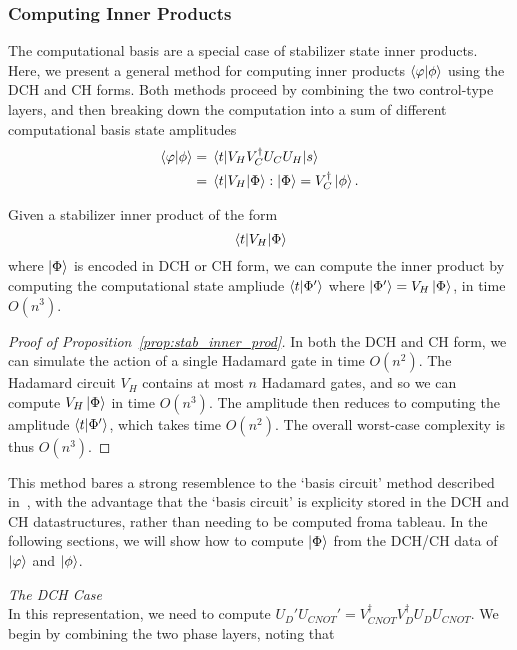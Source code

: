 \subsubsection*{Computing Inner Products}
The computational basis are a special case of stabilizer state inner products. Here, we present a general method for computing inner products $\braket{\varphi}{\phi}$ using the DCH and CH forms. Both methods proceed by combining the two control-type layers, and then breaking down the computation into a sum of different computational basis state amplitudes
\begin{align*}
\braket{\varphi}{\phi} &= \matrixel{t}{V_{H}V_{C}^{\dagger}U_{C}U_{H}}{s} \\
&= \matrixel{t}{V_{H}}{\Phi} : \ket{\Phi} = V_{C}^{\dagger} \ket{\phi}.
\end{align*}
\begin{prop}
Given a stabilizer inner product of the form
\[\matrixel{t}{V_{H}}{\Phi}\]
where $\ket{\Phi}$ is encoded in DCH or CH form, we can compute the inner product by computing the computational state ampliude $\braket{t}{\Phi'}$ where $\ket{\Phi'}=V_{H}\ket{\Phi}$, in time $O(n^{3})$.\label{prop:stab_inner_prod}
\end{prop}
\begin{proof}[Proof of Proposition~\ref{prop:stab_inner_prod}]
In both the DCH and CH form, we can simulate the action of a single Hadamard gate in time $O(n^{2})$. The Hadamard circuit $V_{H}$ contains at most $n$ Hadamard gates, and so we can compute $V_{H}\ket{\Phi}$ in time $O(n^{3})$. The amplitude then reduces to computing the amplitude $\braket{t}{\Phi'}$, which takes time $O(n^{2})$. The overall worst-case complexity is thus $O(n^{3})$.
\end{proof}
This method bares a strong resemblence to the `basis circuit' method described in~\cite{Garcia2012}, with the advantage that the `basis circuit' is explicity stored in the DCH and CH datastructures, rather than needing to be computed froma  tableau. In the following sections, we will show how to compute $\ket{\Phi}$ from the DCH/CH data of $\ket{\varphi}$ and $\ket{\phi}$.\par
\large{\itshape{The DCH Case}}\\
In this representation, we need to compute $U_{D}'U_{CNOT}'=V_{CNOT}^{\dagger}V_{D}^{\dagger}U_{D}U_{CNOT}$. We begin by combining the two phase layers, noting that
